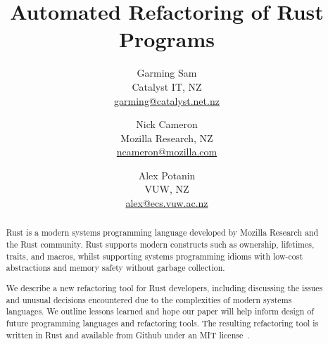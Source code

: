 \documentclass{sig-alternate-05-2015}
\begin{document}
\title{Automated Refactoring of Rust Programs}

\author{Garming Sam\\ Catalyst IT, NZ\\ \url{garming@catalyst.net.nz} \and Nick Cameron\\ Mozilla Research, NZ\\ \url{ncameron@mozilla.com} \and Alex Potanin\\ VUW, NZ\\ \url{alex@ecs.vuw.ac.nz}}


\maketitle

\begin{abstract}
Rust is a modern systems programming language developed by Mozilla Research and the Rust community. Rust supports modern constructs such as ownership, lifetimes, traits, and macros, whilst supporting systems programming idioms with low-cost abstractions and memory safety without garbage collection.

We describe a new refactoring tool for Rust developers, including discussing the issues and unusual decisions encountered due to the complexities of modern systems languages. We outline lessons learned and hope our paper will help inform design of future programming languages and refactoring tools. The resulting refactoring tool is written in Rust and available from Github under an MIT license~\cite{rrproject}.
\end{abstract}










\newpage



\end{document}
